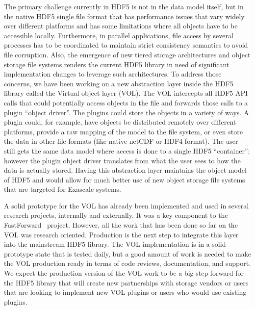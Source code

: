 \documentclass[letterpaper,hyper]{THG_RFC}
\begin{document}
The primary challenge currently in HDF5 is not in the data model itself, but in the native HDF5 single file format that has performance issues that vary widely over different platforms and has some limitations where all objects have to be accessible locally. Furthermore, in parallel applications, file access by several processes has to be coordinated to maintain strict consistency semantics to avoid file corruption. Also, the emergence of new tiered storage architectures and object storage file systems renders the current HDF5 library in need of significant implementation changes to leverage such architectures.
To address those concerns, we have been working on a new abstraction layer inside the HDF5 library called the Virtual object layer (VOL). The VOL intercepts all HDF5 API calls that could potentially access objects in the file and forwards those calls to a plugin ``object driver''. The plugins could store the objects in a variety of ways. A plugin could, for example, have objects be distributed remotely over different platforms, provide a raw mapping of the model to the file system, or even store the data in other file formats (like native netCDF or HDF4 format). The user still gets the same data model where access is done to a single HDF5 ``container''; however the plugin object driver translates from what the user sees to how the data is actually stored. Having this abstraction layer maintains the object model of HDF5 and would allow for much better use of new object storage file systems that are targeted for Exascale systems. 

A solid prototype for the VOL has already been implemented and used in several research projects, internally and externally. It was a key component to the FastForward~\cite{ffwd} project. However, all the work that has been done so far on the VOL was research oriented. Production is the next step to integrate this layer into the mainstream HDF5 library. The VOL implementation is in a solid prototype state that is tested daily, but a good amount of work is needed to make the VOL production ready in terms of code reviews, documentation, and support. We expect the production version of the VOL work to be a big step forward for the HDF5 library that will create new partnerships with storage vendors or users that are looking to implement new VOL plugins or users who would use existing plugins.
\end{document}
